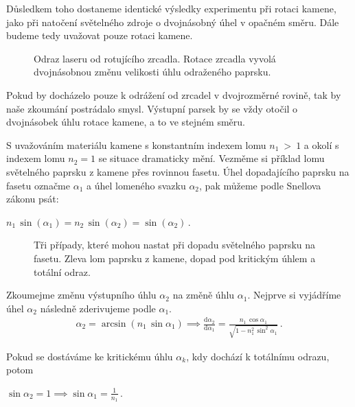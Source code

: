 Důsledkem toho dostaneme identické výsledky experimentu při rotaci kamene, jako při natočení světelného zdroje o dvojnásobný úhel v opačném směru. Dále budeme tedy uvažovat pouze rotaci kamene. 


\begin{figure}[h!]
\begin{center}
\scalebox{1}{ }
\end{center}
\caption{Odraz laseru od rotujícího zrcadla. Rotace zrcadla vyvolá dvojnásobnou změnu velikosti úhlu odraženého paprsku.}
\label{fig:odraz zrcadlo}
\end{figure}

Pokud by docházelo pouze k odrážení od zrcadel v dvojrozměrné rovině, tak by naše zkoumání postrádalo smysl. Výstupní parsek by se vždy otočil o dvojnásobek úhlu rotace kamene, a to ve stejném směru. 

S uvažováním materiálu kamene s konstantním indexem lomu $ n_1~>~1 $ a okolí s indexem lomu $ n_2 = 1 $ se situace dramaticky mění. Vezměme si příklad lomu světelného paprsku z kamene přes rovinnou fasetu. Úhel dopadajícího paprsku na fasetu označme $\alpha_1$ a úhel lomeného svazku $\alpha_2$, pak můžeme podle Snellova zákonu psát:

\begin{center}
$n_1\,\sin(\alpha_1) = n_2\,\sin(\alpha_2) = \sin(\alpha_2)\,.$
\end{center}

\begin{figure}[h!]
\begin{center}
\scalebox{.9}{ }
\end{center}
\caption{Tři případy, které mohou nastat při dopadu světelného paprsku na fasetu. Zleva lom paprsku z kamene, dopad pod kritickým úhlem a totální odraz.}
\label{fig:lom ven }
\end{figure}

Zkoumejme změnu výstupního úhlu $\alpha_2$ na změně úhlu $\alpha_1$. Nejprve si vyjádříme úhel $\alpha_2$ následně zderivujeme podle $\alpha_1$. 
\begin{eqnarray}
\alpha_2 = \arcsin(n_1\,\sin\alpha_1) \implies \frac{\mathrm{d}\alpha_2}{\mathrm{d}\alpha_1}= \frac{n_1\,\cos\alpha_1}{\sqrt{1-n_1^2\,\sin^2\alpha_1}}\,.
\label{eq:derivace uhlu}  
\end{eqnarray}

Pokud se dostáváme ke kritickému úhlu $\alpha_k$, kdy dochází k totálnímu odrazu, potom
\begin{center}
 $	\sin\alpha_2 = 1 \implies \sin\alpha_1 = \frac{1}{n_1}\,. $
\end{center}

